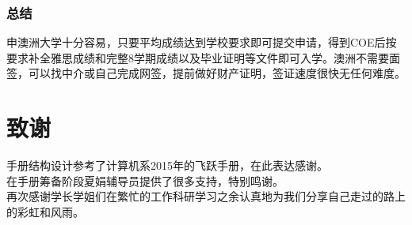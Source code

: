 \documentclass[a4paper,UTF8]{book}
\begin{document}
    \subsection*{总结}
    申澳洲大学十分容易，只要平均成绩达到学校要求即可提交申请，得到COE后按要求补全雅思成绩和完整8学期成绩以及毕业证明等文件即可入学。澳洲不需要面签，可以找中介或自己完成网签，提前做好财产证明，签证速度很快无任何难度。
    

\chapter{致谢}
手册结构设计参考了计算机系2015年的飞跃手册，在此表达感谢。\\

在手册筹备阶段夏娟辅导员提供了很多支持，特别鸣谢。\\

再次感谢学长学姐们在繁忙的工作科研学习之余认真地为我们分享自己走过的路上的彩虹和风雨。
\end{document}
